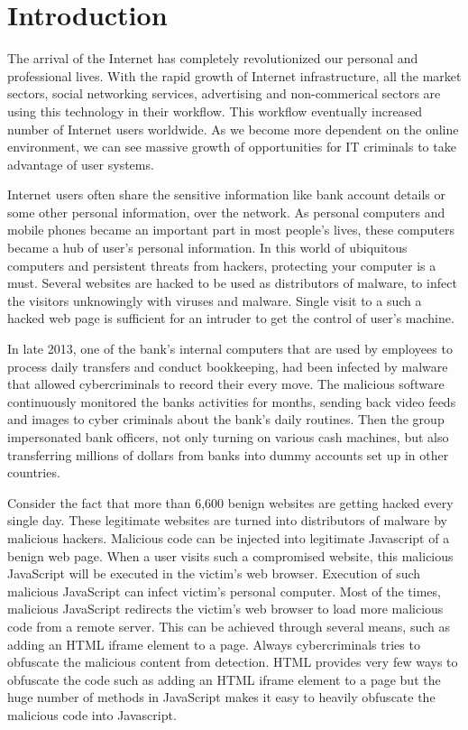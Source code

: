 \chapter{Introduction}

The arrival of the Internet has completely revolutionized our personal and professional lives. With the rapid growth of Internet infrastructure, all the market sectors, social networking services, advertising and non-commerical sectors are using this technology in their workflow. This workflow eventually increased number of Internet users worldwide. As we become more dependent on the online environment, we can see massive growth of opportunities for IT criminals to take advantage of user systems. 

Internet users often share the sensitive information like bank account details or some other personal information, over the network. As personal computers and mobile phones became an important part in most people's lives, these computers became a hub of user's personal information. In this world of ubiquitous computers and persistent threats from hackers, protecting your computer is a must. Several websites are hacked to be used as distributors of malware, to infect the visitors unknowingly with viruses and malware. Single visit to a such a hacked web page is sufficient for an intruder to get the control of user's machine.

In late 2013, one of the bank’s internal computers that are used by employees to process daily transfers and conduct bookkeeping, had been infected by malware that allowed cybercriminals to record their every move. The malicious software continuously monitored the banks activities for months, sending back video feeds and images to cyber criminals about the bank's daily routines. Then the group impersonated bank officers, not only turning on various cash machines, but also transferring millions of dollars from banks into dummy accounts set up in other countries.

Consider the fact that more than 6,600 benign websites are getting hacked every single day. These legitimate websites are turned into distributors of malware by malicious hackers. Malicious code can be injected into legitimate Javascript of a benign web page. When a user visits such a compromised website, this malicious JavaScript will be executed in the victim's web browser. Execution of such malicious JavaScript can infect victim's personal computer. Most of the times, malicious JavaScript redirects the victim's web browser to load more malicious code from a remote server. This can be achieved through several means, such as adding an HTML iframe element to a page. Always cybercriminals tries to obfuscate the malicious content from detection. HTML provides very few ways to obfuscate the code such as adding an HTML iframe element to a page but the huge number of methods in JavaScript makes it easy to heavily obfuscate the malicious code into Javascript.

